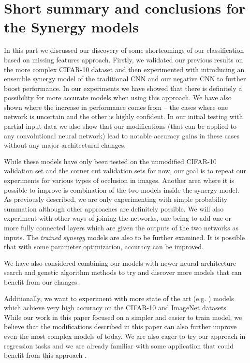 \documentclass[b5paper]{book}
\let\cite\parencite
\begin{document}
\section{Short summary and conclusions for the Synergy models}
\label{summary}

In this part we discussed our discovery of some shortcomings of our classification based on missing features approach. Firstly, we validated our previous results on the more complex CIFAR-10 dataset and then experimented with introducing an ensemble synergy model of the traditional CNN and our negative CNN to further boost performance. In our experiments we have showed that there is definitely a possibility for more accurate models when using this approach. We have also shown where the increase in performance comes from -- the cases where one network is uncertain and the other is highly confident. In our initial testing with partial input data we also show that our modifications (that can be applied to any convolutional neural network) lead to notable accuracy gains in these cases without any major architectural changes.

While these models have only been tested on the unmodified CIFAR-10 validation set and the corner cut validation sets for now, our goal is to repeat our experiments for various types of occlusion in images. Another area where it is possible to improve is combination of the two models inside the synergy model. As previously described, we are only experimenting with simple probability summation although other approaches are definitely possible. We will also experiment with other ways of joining the networks, one being to add one or more fully connected layers which are given the outputs of the two networks as inputs. The \emph{trained synergy} models are also to be further examined. It is possible that with some parameter optimization, accuracy can be improved.

We have also considered combining our models with newer neural architecture search \cite{elsken2019neural} and genetic algorithm methods \cite{assunccao2019fast} to try and discover more models that can benefit from our changes.

Additionally, we want to experiment with more state of the art (e.g. \cite{he2016deep,huang2017densely,xie2017aggregated}) models which achieve very high accuracy on the CIFAR-10 and ImageNet \cite{deng2009imagenet} datasets. While our work in this paper focused on a simpler and easier to train model, we believe that the modifications described in this paper can also further improve even the most complex models of today. We are also eager to try our approach in regression tasks and we are already familiar with some application that could benefit from this approach \cite{pecev2016system,pecev2017ltr}.
\end{document}
